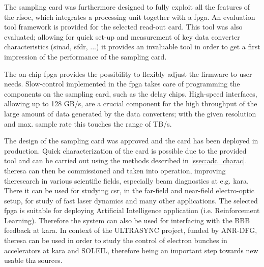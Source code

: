 The sampling card was furthermore designed to fully exploit all the features of the \gls{rfsoc}, which integrates a processing unit together with a \gls{fpga}.
An evaluation tool framework is provided for the selected read-out card.
This tool was also evaluated; allowing for quick set-up and measurement of key data converter characteristics (\gls{sinad}, \gls{sfdr}, ...) it provides an invaluable tool in order to get a first impression of the performance of the sampling card.

The on-chip \gls{fpga} provides the possibility to flexibly adjust the firmware to user needs. 
Slow-control implemented in the \gls{fpga} takes care of programming the components on the sampling card, such as the delay chips.
High-speed interfaces, allowing up to 128 GB/s, are a crucial component for the high throughput of the large amount of data generated by the data converters; with the given resolution and max. sample rate this touches the range of TB/s.


The design of the sampling card was approved and the card has been deployed in production.
Quick characterization of the card is possible due to the provided tool and can be carried out using the methods described in \autoref{ssec:adc_charac}.
\gls{theresa} can then be commissioned and taken into operation, improving theresearch in various scientific fields, especially beam diagnostics at e.g. \gls{kara}. 
There it can be used for studying \gls{csr}, in the far-field and near-field electro-optic setup, for study of fast laser dynamics and many other applications.
The selected \gls{fpga} is suitable for deploying Artificial Intelligence application (i.e. Reinforcement Learning).
Therefore the system can also be used for interfacing with the BBB feedback at \gls{kara}.
In context of the ULTRASYNC project, funded by ANR-DFG, \gls{theresa} can be used in order to study the control of electron bunches in accelerators at \gls{kara} and SOLEIL, therefore being an important step towards new usable \gls{thz} sources. 
 

